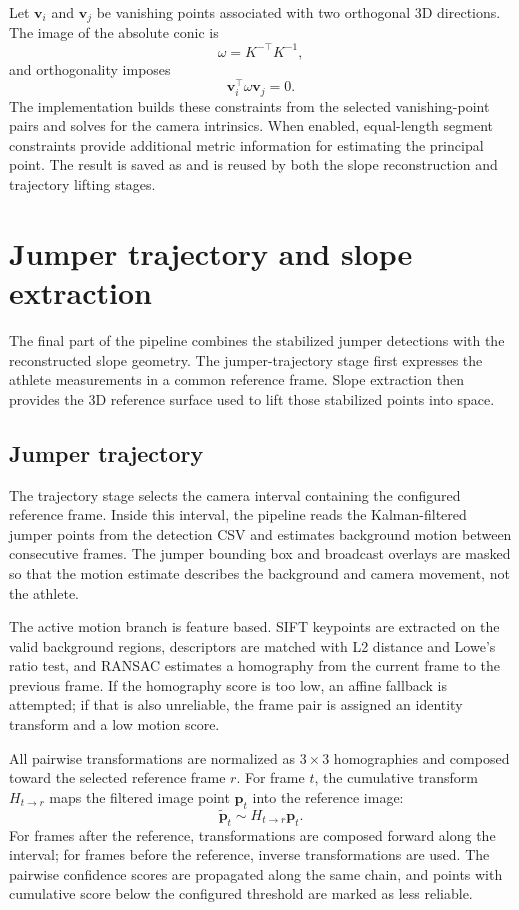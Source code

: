 Let \(\mathbf{v}_i\) and \(\mathbf{v}_j\) be vanishing points associated with two orthogonal 3D directions. The image of the absolute conic is
\[
\omega = K^{-\top}K^{-1},
\]
and orthogonality imposes
\[
\mathbf{v}_i^\top \omega \mathbf{v}_j = 0.
\]
The implementation builds these constraints from the selected vanishing-point pairs and solves for the camera intrinsics. When enabled, equal-length segment constraints provide additional metric information for estimating the principal point. The result is saved as  and is reused by both the slope reconstruction and trajectory lifting stages.

\section{Jumper trajectory and slope extraction}
The final part of the pipeline combines the stabilized jumper detections with the reconstructed slope geometry. The jumper-trajectory stage first expresses the athlete measurements in a common reference frame. Slope extraction then provides the 3D reference surface used to lift those stabilized points into space.

\subsection{Jumper trajectory}
The trajectory stage selects the camera interval containing the configured reference frame. Inside this interval, the pipeline reads the Kalman-filtered jumper points from the detection CSV and estimates background motion between consecutive frames. The jumper bounding box and broadcast overlays are masked so that the motion estimate describes the background and camera movement, not the athlete.

The active motion branch is feature based. SIFT keypoints are extracted on the valid background regions, descriptors are matched with L2 distance and Lowe's ratio test, and RANSAC estimates a homography from the current frame to the previous frame. If the homography score is too low, an affine fallback is attempted; if that is also unreliable, the frame pair is assigned an identity transform and a low motion score.

All pairwise transformations are normalized as \(3 \times 3\) homographies and composed toward the selected reference frame \(r\). For frame \(t\), the cumulative transform \(H_{t\rightarrow r}\) maps the filtered image point \(\mathbf{p}_t\) into the reference image:
\[
\tilde{\mathbf{p}}_t \sim H_{t\rightarrow r}\mathbf{p}_t.
\]
For frames after the reference, transformations are composed forward along the interval; for frames before the reference, inverse transformations are used. The pairwise confidence scores are propagated along the same chain, and points with cumulative score below the configured threshold are marked as less reliable.

